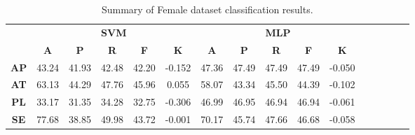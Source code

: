 \begin{landscape}
\begin{table}[htbp]
\footnotesize
\centering
\caption{Summary of Female dataset classification results.}
\label{tab:base_female}
\begin{tabular}{|c|c|c|c|c|c|c|c|c|c|c|c|c|c|c|c|}
\hline
\multirow{2}{*}{}	& \multicolumn{5}{c|}{\textbf{SVM}}												& \multicolumn{5}{c|}{\textbf{MLP}}												\\ \cline{2-11} 
					& \textbf{A}	& \textbf{P}	& \textbf{R}	& \textbf{F}	& \textbf{K}	& \textbf{A}	& \textbf{P}	& \textbf{R}	& \textbf{F}	& \textbf{K}	\\ \hline
\textbf{AP}			& 43.24			& 41.93			& 42.48			& 42.20			& -0.152			& 47.36			& 47.49			& 47.49			& 47.49			& -0.050			\\ \hline
\textbf{AT}			& 63.13			& 44.29			& 47.76			& 45.96			& 0.055			& 58.07			& 43.34			& 45.50			& 44.39			& -0.102			\\ \hline
\textbf{PL}			& 33.17			& 31.35			& 34.28			& 32.75			& -0.306			& 46.99			& 46.95			& 46.94			& 46.94			& -0.061			\\ \hline
\textbf{SE}			& 77.68			& 38.85			& 49.98			& 43.72			& -0.001			& 70.17			& 45.74			& 47.66			& 46.68			& -0.058			\\ \hline
\end{tabular}
\end{table}
\end{landscape}